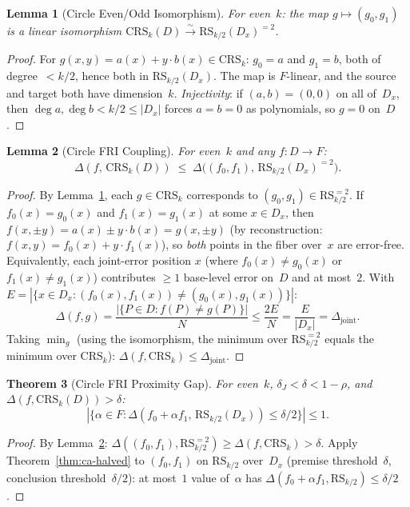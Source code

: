 \documentclass[11pt]{article}
\newtheorem{theorem}{Theorem}
\newtheorem{lemma}[theorem]{Lemma}
\newcommand{\RS}{\mathrm{RS}}
\begin{document}
\begin{lemma}[Circle Even/Odd Isomorphism]
\label{lem:circle-iso}
For even~$k$: the map $g \mapsto (g_0, g_1)$ is a linear isomorphism $\mathrm{CRS}_k(D) \xrightarrow{\sim} \RS_{k/2}(D_x)^{=2}$.
\end{lemma}

\begin{proof}
For $g(x,y) = a(x) + y \cdot b(x) \in \mathrm{CRS}_k$: $g_0 = a$ and $g_1 = b$, both of degree~$< k/2$, hence both in $\RS_{k/2}(D_x)$. The map is $F$-linear, and the source and target both have dimension~$k$. \emph{Injectivity}: if $(a,b) = (0,0)$ on all of~$D_x$, then $\deg a, \deg b < k/2 \leq |D_x|$ forces $a = b = 0$ as polynomials, so $g = 0$ on~$D$.
\end{proof}

\begin{lemma}[Circle FRI Coupling]
\label{lem:circle-coupling}
For even~$k$ and any $f: D \to F$:
$$\Delta(f,\, \mathrm{CRS}_k(D)) \;\leq\; \Delta\bigl((f_0, f_1),\, \RS_{k/2}(D_x)^{=2}\bigr).$$
\end{lemma}

\begin{proof}
By Lemma~\ref{lem:circle-iso}, each $g \in \mathrm{CRS}_k$ corresponds to $(g_0, g_1) \in \RS_{k/2}^{=2}$. If $f_0(x) = g_0(x)$ and $f_1(x) = g_1(x)$ at some $x \in D_x$, then $f(x, \pm y) = a(x) \pm y \cdot b(x) = g(x, \pm y)$ (by reconstruction: $f(x,y) = f_0(x) + y \cdot f_1(x)$), so \emph{both} points in the fiber over~$x$ are error-free. Equivalently, each joint-error position $x$ (where $f_0(x) \neq g_0(x)$ or $f_1(x) \neq g_1(x)$) contributes $\geq 1$ base-level error on~$D$ and at most~$2$. With $E = |\{x \in D_x : (f_0(x), f_1(x)) \neq (g_0(x), g_1(x))\}|$:
$$\Delta(f, g) = \frac{|\{P \in D : f(P) \neq g(P)\}|}{N} \leq \frac{2E}{N} = \frac{E}{|D_x|} = \Delta_{\mathrm{joint}}.$$
Taking $\min_g$ (using the isomorphism, the minimum over $\RS_{k/2}^{=2}$ equals the minimum over $\mathrm{CRS}_k$): $\Delta(f, \mathrm{CRS}_k) \leq \Delta_{\mathrm{joint}}$.
\end{proof}

\begin{theorem}[Circle FRI Proximity Gap]
\label{thm:circle-pg}
For even~$k$, $\delta_J < \delta < 1{-}\rho$, and $\Delta(f, \mathrm{CRS}_k(D)) > \delta$:
$$|\{\alpha \in F : \Delta(f_0 + \alpha f_1,\, \RS_{k/2}(D_x)) \leq \delta/2\}| \leq 1.$$
\end{theorem}

\begin{proof}
By Lemma~\ref{lem:circle-coupling}: $\Delta((f_0, f_1), \RS_{k/2}^{=2}) \geq \Delta(f, \mathrm{CRS}_k) > \delta$. Apply Theorem~\ref{thm:ca-halved} to $(f_0, f_1)$ on $\RS_{k/2}$ over~$D_x$ (premise threshold~$\delta$, conclusion threshold~$\delta/2$): at most~$1$ value of~$\alpha$ has $\Delta(f_0 + \alpha f_1, \RS_{k/2}) \leq \delta/2$.
\end{proof}
\end{document}
